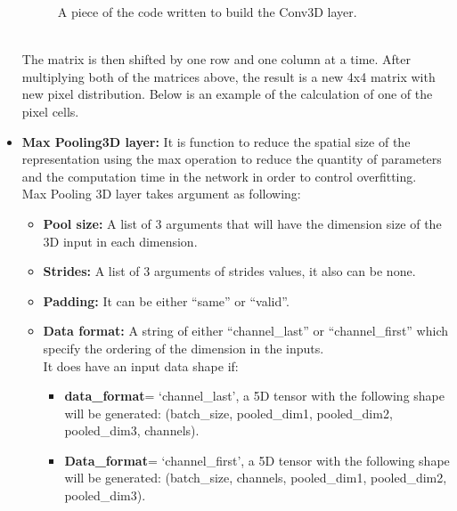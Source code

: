 \begin{itemize}
\begin{figure}[ht]
    \decoRule
    \caption[A piece of the code written to build the Conv3D layer.]{A piece of the code written to build the Conv3D layer.}
    \label{fig:la}
    \end{figure}\hfill \\
    The matrix is then shifted by one row and one column at a time. After multiplying both of the matrices above, the result is a new 4x4 matrix with new pixel distribution. Below is an example of the calculation of one of the pixel cells.\hfill \\
    \item \textbf{Max Pooling3D layer:} It is function to reduce the spatial size of the representation using the max operation to reduce the quantity of parameters and the computation time in the network in order to control overfitting.\\
    Max Pooling 3D layer takes argument as following:\\
    \noindent{}
\begin{itemize}
    \item \textbf{Pool size:} A list of 3 arguments that will have the dimension size of the 3D input in each dimension.
    \item \textbf{Strides:} A list of 3 arguments of strides values, it also can be none.
    \item \textbf{Padding:} It can be either “same” or “valid”.
    \item \textbf{Data format:} A string of either “channel\_last” or “channel\_first” which specify the ordering of the dimension in the inputs.\hfill \\
    It does have an input data shape if:
    \begin{itemize}
        \item \textbf{data\_format}= ‘channel\_last’, a 5D tensor with the following shape will be generated: (batch\_size, pooled\_dim1, pooled\_dim2, pooled\_dim3, channels).
        \item \textbf{Data\_format}= ‘channel\_first’, a 5D tensor with the following shape will be generated: (batch\_size, channels, pooled\_dim1, pooled\_dim2, pooled\_dim3).\hfill \\

\end{itemize}
\end{itemize}
\end{itemize}
